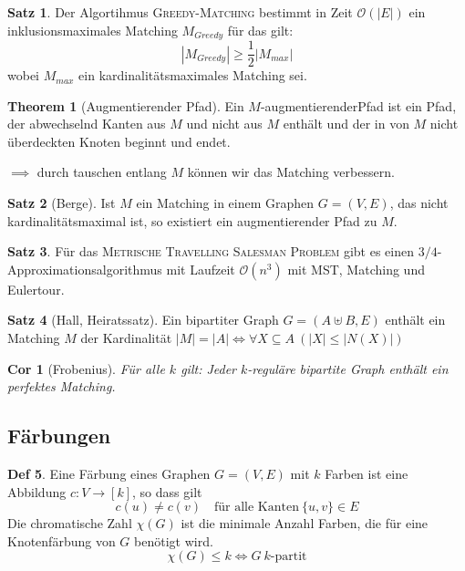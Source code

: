 \documentclass[a4paper, 10pt]{article}
\newtheorem*{corollary}{Cor}
\theoremstyle{definition}
\newtheorem{definition}{Def}[section]
\newtheorem{theorem}[definition]{Satz}
\theoremstyle{named}
\newtheorem*{ntheorem}{Theorem}
\newcommand{\BO}{\mathcal{O}}
\begin{document}
\setcounter{definition}{46}
\begin{theorem}
    Der Algortihmus \textsc{Greedy-Matching} bestimmt in Zeit $\BO(|E|)$ ein inklusionsmaximales Matching $M_{Greedy}$ für das gilt:
    $$|M_{Greedy}| \geq \frac{1}{2}|M_{max}|$$
    wobei $M_{max}$ ein kardinalitätsmaximales Matching sei.
\end{theorem}

\begin{ntheorem}[Augmentierender Pfad]
    Ein $M$-augmentierenderPfad ist ein Pfad, der abwechselnd Kanten aus $M$ und nicht aus $M$ enthält und der in von $M$ nicht überdeckten Knoten beginnt und endet.

    $\implies$ durch tauschen entlang $M$ können wir das Matching verbessern.
\end{ntheorem}

\begin{theorem}[Berge]
    Ist $M$ ein Matching in einem Graphen $G = (V, E)$, das nicht kardinalitätsmaximal ist, so existiert ein augmentierender Pfad zu $M$.
\end{theorem}

\setcounter{definition}{50}
\begin{theorem}
    Für das \textsc{Metrische Travelling Salesman Problem} gibt es einen $3/4$-Approximationsalgorithmus mit Laufzeit $\BO(n^3)$ mit MST, Matching und Eulertour.
\end{theorem}

\begin{theorem}[Hall, Heiratssatz]
    Ein bipartiter Graph $G = (A \uplus B, E)$ enthält ein Matching $M$ der Kardinalität $|M| = |A| \iff \forall X \subseteq A \ (|X| \leq |N(X)|)$ 
\end{theorem}

\begin{corollary}[Frobenius]
    Für alle $k$ gilt: Jeder $k$-reguläre bipartite Graph enthält ein perfektes Matching.
\end{corollary}

\subsection{Färbungen}
\setcounter{definition}{55}
\begin{definition}
    Eine Färbung eines Graphen $G = (V, E)$ mit $k$ Farben ist eine Abbildung $c: V \to [k]$, so dass gilt
    $$c(u) \neq c(v) \quad \text{für alle Kanten} \ \{u, v\} \in E$$
    Die chromatische Zahl $\chi(G)$ ist die minimale Anzahl Farben, die für eine Knotenfärbung von $G$ benötigt wird.
    $$\chi(G) \leq k \iff G \ k\text{-partit}$$
\end{definition}
\end{document}

